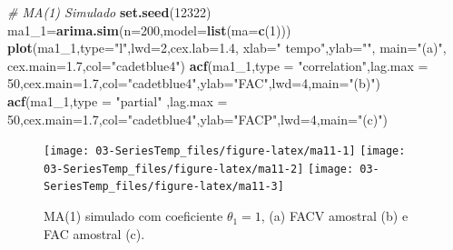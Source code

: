 \documentclass[
]{book}
\newenvironment{Shaded}{\begin{snugshade}}{\end{snugshade}}
\newcommand{\CommentTok}[1]{\textcolor[rgb]{0.56,0.35,0.01}{\textit{#1}}}
\newcommand{\DataTypeTok}[1]{\textcolor[rgb]{0.13,0.29,0.53}{#1}}
\newcommand{\DecValTok}[1]{\textcolor[rgb]{0.00,0.00,0.81}{#1}}
\newcommand{\FloatTok}[1]{\textcolor[rgb]{0.00,0.00,0.81}{#1}}
\newcommand{\KeywordTok}[1]{\textcolor[rgb]{0.13,0.29,0.53}{\textbf{#1}}}
\newcommand{\NormalTok}[1]{#1}
\newcommand{\StringTok}[1]{\textcolor[rgb]{0.31,0.60,0.02}{#1}}
\theoremstyle{definition}
\theoremstyle{definition}
\theoremstyle{definition}
\theoremstyle{remark}
\begin{document}
\begin{Shaded}
\begin{Highlighting}[]
\CommentTok{# MA(1) Simulado}
\KeywordTok{set.seed}\NormalTok{(}\DecValTok{12322}\NormalTok{)}
\NormalTok{ma1_}\DecValTok{1}\NormalTok{=}\KeywordTok{arima.sim}\NormalTok{(}\DataTypeTok{n=}\DecValTok{200}\NormalTok{,}\DataTypeTok{model=}\KeywordTok{list}\NormalTok{(}\DataTypeTok{ma=}\KeywordTok{c}\NormalTok{(}\DecValTok{1}\NormalTok{)))}
\KeywordTok{plot}\NormalTok{(ma1_}\DecValTok{1}\NormalTok{,}\DataTypeTok{type=}\StringTok{"l"}\NormalTok{,}\DataTypeTok{lwd=}\DecValTok{2}\NormalTok{,}\DataTypeTok{cex.lab=}\FloatTok{1.4}\NormalTok{, }\DataTypeTok{xlab=}\StringTok{" tempo"}\NormalTok{,}\DataTypeTok{ylab=}\StringTok{""}\NormalTok{, }\DataTypeTok{main=}\StringTok{"(a)"}\NormalTok{, }\DataTypeTok{cex.main=}\FloatTok{1.7}\NormalTok{,}\DataTypeTok{col=}\StringTok{"cadetblue4"}\NormalTok{)}
\KeywordTok{acf}\NormalTok{(ma1_}\DecValTok{1}\NormalTok{,}\DataTypeTok{type =} \StringTok{"correlation"}\NormalTok{,}\DataTypeTok{lag.max =} \DecValTok{50}\NormalTok{,}\DataTypeTok{cex.main=}\FloatTok{1.7}\NormalTok{,}\DataTypeTok{col=}\StringTok{"cadetblue4"}\NormalTok{,}\DataTypeTok{ylab=}\StringTok{"FAC"}\NormalTok{,}\DataTypeTok{lwd=}\DecValTok{4}\NormalTok{,}\DataTypeTok{main=}\StringTok{"(b)"}\NormalTok{)}
\KeywordTok{acf}\NormalTok{(ma1_}\DecValTok{1}\NormalTok{,}\DataTypeTok{type =} \StringTok{"partial"}\NormalTok{ ,}\DataTypeTok{lag.max =} \DecValTok{50}\NormalTok{,}\DataTypeTok{cex.main=}\FloatTok{1.7}\NormalTok{,}\DataTypeTok{col=}\StringTok{"cadetblue4"}\NormalTok{,}\DataTypeTok{ylab=}\StringTok{"FACP"}\NormalTok{,}\DataTypeTok{lwd=}\DecValTok{4}\NormalTok{,}\DataTypeTok{main=}\StringTok{"(c)"}\NormalTok{)}
\end{Highlighting}
\end{Shaded}

\begin{figure}
\texttt{[image: 03-SeriesTemp\_files/figure-latex/ma11-1]} \texttt{[image: 03-SeriesTemp\_files/figure-latex/ma11-2]} \texttt{[image: 03-SeriesTemp\_files/figure-latex/ma11-3]} \caption{MA(1) simulado com coeficiente $\theta_1=1$, (a) FACV amostral (b) e FAC amostral (c).}\label{fig:ma11}
\end{figure}
\end{document}
